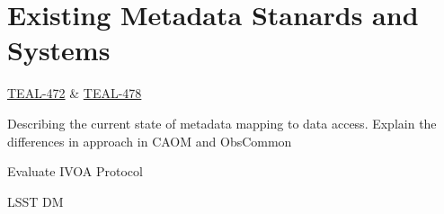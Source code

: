 \section{Existing Metadata Stanards and Systems}\label{sec:exist_mod}

\href{https://jira.skatelescope.org/browse/TEAL-472}{TEAL-472} \& \href{https://jira.skatelescope.org/browse/TEAL-478}{TEAL-478}

Describing the current state of metadata mapping to data access. Explain the differences in approach in CAOM and ObsCommon 

Evaluate IVOA Protocol 

LSST DM